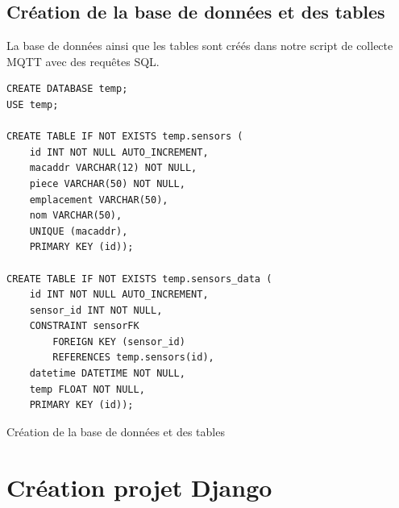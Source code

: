 \documentclass{article}
\begin{document}
\subsection{Création de la base de données et des tables}
La base de données ainsi que les tables sont créés dans notre script de collecte MQTT avec des requêtes SQL.
\begin{listing}[H]
    \begin{verbatim}
CREATE DATABASE temp;
USE temp;

CREATE TABLE IF NOT EXISTS temp.sensors (
    id INT NOT NULL AUTO_INCREMENT,
    macaddr VARCHAR(12) NOT NULL,
    piece VARCHAR(50) NOT NULL,
    emplacement VARCHAR(50),
    nom VARCHAR(50),
    UNIQUE (macaddr),
    PRIMARY KEY (id));

CREATE TABLE IF NOT EXISTS temp.sensors_data (
    id INT NOT NULL AUTO_INCREMENT,
    sensor_id INT NOT NULL,
    CONSTRAINT sensorFK
        FOREIGN KEY (sensor_id)
        REFERENCES temp.sensors(id),
    datetime DATETIME NOT NULL,
    temp FLOAT NOT NULL,
    PRIMARY KEY (id));
    \end{verbatim}
    \caption{Création de la base de données et des tables}
    \label{bdd:creation}
\end{listing}

\section{Création projet Django}
\subsection{}
\end{document}
